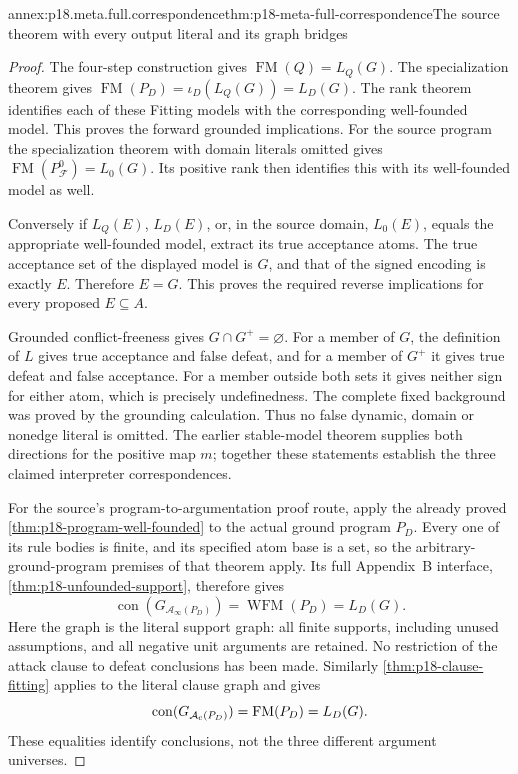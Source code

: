 \begin{annexitem}{annex:p18.meta.full.correspondence}{thm:p18-meta-full-correspondence}{The source theorem with every output literal and its graph bridges}
\begin{proof}
The four-step construction gives
\(\operatorname{FM}(Q)=L_Q(G)\).
The specialization theorem gives
\(\operatorname{FM}(P_D)=\iota_D(L_Q(G))=L_D(G)\).
The rank theorem identifies each of these Fitting
models with the corresponding well-founded model.
This proves the forward grounded implications.
For the source program the specialization theorem with
domain literals omitted gives
\(\operatorname{FM}(P^0_{\mathcal F})=L_0(G)\).
Its positive rank then identifies this with its
well-founded model as well.

Conversely if \(L_Q(E)\), \(L_D(E)\), or, in the
source domain, \(L_0(E)\), equals the
appropriate well-founded model, extract its true
acceptance atoms. The true acceptance set of the
displayed model is \(G\), and that of the signed
encoding is exactly \(E\). Therefore \(E=G\).
This proves the required reverse implications for
every proposed \(E\subseteq A\).

Grounded conflict-freeness gives \(G\cap G^+=\varnothing\).
For a member of \(G\), the definition of \(L\) gives
true acceptance and false defeat, and for a member
of \(G^+\) it gives true defeat and false acceptance.
For a member outside both sets it gives neither
sign for either atom, which is precisely undefinedness.
The complete fixed background was proved by the
grounding calculation. Thus no false dynamic,
domain or nonedge literal is omitted.
The earlier stable-model theorem supplies both
directions for the positive map \(m\); together
these statements establish the three claimed
interpreter correspondences.

For the source's program-to-argumentation proof
route, apply the already proved
\cref{thm:p18-program-well-founded} to the actual
ground program \(P_D\). Every one of its rule
bodies is finite, and its specified atom base
is a set, so the arbitrary-ground-program
premises of that theorem apply. Its full
Appendix~B interface, \cref{thm:p18-unfounded-support},
therefore gives
\[
 \operatorname{con}(G_{\mathcal A_\infty(P_D)})
                         =\operatorname{WFM}(P_D)=L_D(G).
\]
Here the graph is the literal support graph:
all finite supports, including unused assumptions,
and all negative unit arguments are retained.
No restriction of the attack clause to defeat
conclusions has been made.
Similarly \cref{thm:p18-clause-fitting} applies
to the literal clause graph and gives
\[
 \operatorname{con}(G_{\mathcal A_{\rm c}(P_D)})
                         =\operatorname{FM}(P_D)=L_D(G).
\]
These equalities identify conclusions, not the
three different argument universes.


\end{proof}
\end{annexitem}

